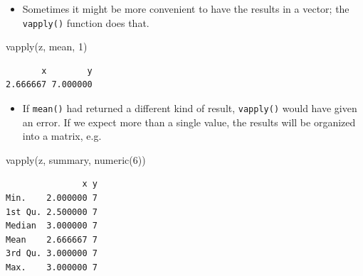 \documentclass[
  9pt,
  a4paper,
  ignorenonframetext,
  notheorems]{beamer}
\newenvironment{Shaded}{\begin{snugshade}}{\end{snugshade}}
\newcommand{\DecValTok}[1]{\textcolor[rgb]{0.68,0.00,0.00}{#1}}
\newcommand{\FunctionTok}[1]{\textcolor[rgb]{0.28,0.35,0.67}{#1}}
\newcommand{\NormalTok}[1]{\textcolor[rgb]{0.00,0.23,0.31}{#1}}
\providecommand{\tightlist}{%
  \setlength{\itemsep}{0pt}\setlength{\parskip}{0pt}}\usepackage{longtable,booktabs,array}
\begin{document}
\begin{frame}[fragile]
\begin{itemize}
\tightlist
\item
  Sometimes it might be more convenient to have the results in a vector;
  the \texttt{vapply()} function does that.
\end{itemize}

\begin{Shaded}
\begin{Highlighting}[]
\FunctionTok{vapply}\NormalTok{(z, mean, }\DecValTok{1}\NormalTok{)}
\end{Highlighting}
\end{Shaded}

\begin{verbatim}
       x        y 
2.666667 7.000000 
\end{verbatim}

\begin{itemize}
\tightlist
\item
  If \texttt{mean()} had returned a different kind of result,
  \texttt{vapply()} would have given an error. If we expect more than a
  single value, the results will be organized into a matrix, e.g.
\end{itemize}

\begin{Shaded}
\begin{Highlighting}[]
\FunctionTok{vapply}\NormalTok{(z, summary, }\FunctionTok{numeric}\NormalTok{(}\DecValTok{6}\NormalTok{))}
\end{Highlighting}
\end{Shaded}

\begin{verbatim}
               x y
Min.    2.000000 7
1st Qu. 2.500000 7
Median  3.000000 7
Mean    2.666667 7
3rd Qu. 3.000000 7
Max.    3.000000 7
\end{verbatim}
\end{frame}
\end{document}
